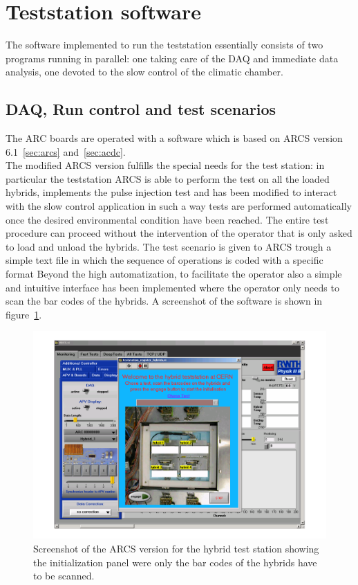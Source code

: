 \section{Teststation software}

The software implemented to run the teststation essentially consists of two programs running in parallel: one taking care of the DAQ and immediate data analysis, one devoted to the slow control of the climatic chamber. 

\subsection{DAQ, Run control and test scenarios}

The ARC boards are operated with a software which is based on ARCS version 6.1~\ref{sec:arcs} and~\ref{sec:acdc}.\\
The modified ARCS version fulfills the special needs for the test station: in particular the teststation ARCS is able to perform the test on all the loaded hybrids, implements the pulse injection test and 
has been modified to interact with the slow control application in such a way tests are performed automatically once the desired environmental condition have been reached. The entire test procedure can proceed without the intervention of the operator that is only asked to load and unload the hybrids. The test scenario is given to ARCS trough a simple text file in which the sequence of operations is coded with a specific format
Beyond the high automatization, to facilitate the operator also a simple and intuitive interface has been implemented where the operator only needs to scan the bar codes of the hybrids. A screenshot of the software is shown in figure~\ref{fig:ss_arcs_teststation}.
\begin{figure}[h]
  \begin{center}
    \includegraphics[width=\textwidth]{fig/ss_arcs_hybrid_test_station_mod.pdf}
    \caption{Screenshot of the ARCS version for the hybrid test station showing the initialization panel were only the bar codes of the hybrids have to be scanned.}
    \label{fig:ss_arcs_teststation}
  \end{center}
\end{figure}

